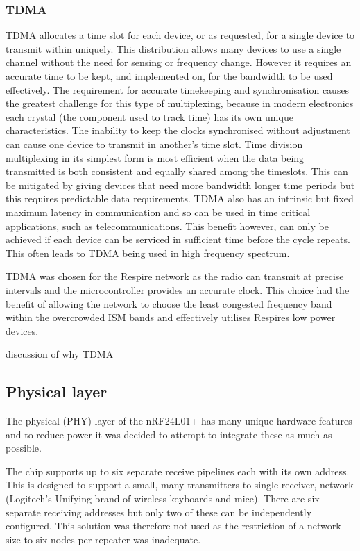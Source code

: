 \subsubsection{\acf{TDMA}}
TDMA allocates a time slot for each device, or as requested, for a single device to transmit within
uniquely. This distribution allows many devices to use a single channel without the need for sensing
or frequency change. However it requires an accurate time to be kept, and implemented on, for the
bandwidth to be used effectively. The requirement for accurate timekeeping and synchronisation
causes the greatest challenge for this type of multiplexing, because in modern electronics each
crystal (the component used to track time) has its own unique characteristics. The inability to keep
the clocks synchronised without adjustment can cause one device to transmit in another's time slot.
Time division multiplexing in its simplest form is most efficient when the data being transmitted is
both consistent and equally shared among the timeslots. This can be mitigated by giving devices that
need more bandwidth longer time periods but this requires predictable data requirements.
TDMA also has an intrinsic but fixed maximum latency in communication and so can be used in time
critical applications, such as telecommunications. This benefit however, can only be achieved if each
device can be serviced in sufficient time before the cycle repeats. This often leads to TDMA being
used in high frequency spectrum.


TDMA was chosen for the Respire network as the radio can transmit at precise intervals and the
microcontroller provides an accurate clock. This choice had the benefit of allowing the network to
choose the least congested frequency band within the overcrowded ISM bands and effectively
utilises Respires low power devices.


{discussion of why TDMA}


\subsection{Physical layer}
The physical (PHY) layer of the nRF24L01+ has many unique hardware features and to reduce power
it was decided to attempt to integrate these as much as possible.


The chip supports up to six separate receive pipelines each with its own address. This is designed to
support a small, many transmitters to single receiver, network (\eg Logitech’s Unifying brand of
wireless keyboards and mice). There are six separate receiving addresses but only two of these can 
be independently configured. This solution was therefore not used as the restriction of a network
size to six nodes per repeater was inadequate.



